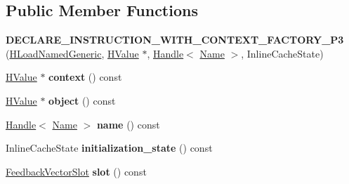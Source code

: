 \subsection*{Public Member Functions}
\begin{DoxyCompactItemize}
\item 
{\bfseries D\+E\+C\+L\+A\+R\+E\+\_\+\+I\+N\+S\+T\+R\+U\+C\+T\+I\+O\+N\+\_\+\+W\+I\+T\+H\+\_\+\+C\+O\+N\+T\+E\+X\+T\+\_\+\+F\+A\+C\+T\+O\+R\+Y\+\_\+\+P3} (\hyperlink{classv8_1_1internal_1_1_h_load_named_generic}{H\+Load\+Named\+Generic}, \hyperlink{classv8_1_1internal_1_1_h_value}{H\+Value} $\ast$, \hyperlink{classv8_1_1internal_1_1_handle}{Handle}$<$ \hyperlink{classv8_1_1internal_1_1_name}{Name} $>$, Inline\+Cache\+State)\hypertarget{classv8_1_1internal_1_1_h_load_named_generic_a2ac525d4c330deabfdc15af636a3dcec}{}\label{classv8_1_1internal_1_1_h_load_named_generic_a2ac525d4c330deabfdc15af636a3dcec}

\item 
\hyperlink{classv8_1_1internal_1_1_h_value}{H\+Value} $\ast$ {\bfseries context} () const \hypertarget{classv8_1_1internal_1_1_h_load_named_generic_ae15981f5dc19cd3b0029bf5b32dc6557}{}\label{classv8_1_1internal_1_1_h_load_named_generic_ae15981f5dc19cd3b0029bf5b32dc6557}

\item 
\hyperlink{classv8_1_1internal_1_1_h_value}{H\+Value} $\ast$ {\bfseries object} () const \hypertarget{classv8_1_1internal_1_1_h_load_named_generic_a9df50fa0f496fbbd2a380ed85661fcef}{}\label{classv8_1_1internal_1_1_h_load_named_generic_a9df50fa0f496fbbd2a380ed85661fcef}

\item 
\hyperlink{classv8_1_1internal_1_1_handle}{Handle}$<$ \hyperlink{classv8_1_1internal_1_1_name}{Name} $>$ {\bfseries name} () const \hypertarget{classv8_1_1internal_1_1_h_load_named_generic_a21d5b1e364977122f0a738f1a7abf622}{}\label{classv8_1_1internal_1_1_h_load_named_generic_a21d5b1e364977122f0a738f1a7abf622}

\item 
Inline\+Cache\+State {\bfseries initialization\+\_\+state} () const \hypertarget{classv8_1_1internal_1_1_h_load_named_generic_aa3693276405023d7908ffced8e282b82}{}\label{classv8_1_1internal_1_1_h_load_named_generic_aa3693276405023d7908ffced8e282b82}

\item 
\hyperlink{classv8_1_1internal_1_1_feedback_vector_slot}{Feedback\+Vector\+Slot} {\bfseries slot} () const \hypertarget{classv8_1_1internal_1_1_h_load_named_generic_a73b18375006a12a817f3978278c88696}{}\label{classv8_1_1internal_1_1_h_load_named_generic_a73b18375006a12a817f3978278c88696}


\end{DoxyCompactItemize}
